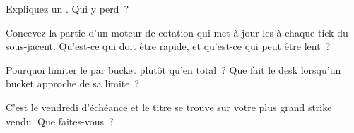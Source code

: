 \begin{interviewq}\label{iq:dv:options-market-making-in-practice:3}
Expliquez un . Qui y perd~?
\end{interviewq}

\begin{interviewq}\label{iq:dv:options-market-making-in-practice:4}
Concevez la partie d'un moteur de cotation qui met à jour les  à chaque tick du sous-jacent. Qu'est-ce qui doit être rapide, et qu'est-ce qui peut être lent~?
\end{interviewq}

\begin{interviewq}\label{iq:dv:options-market-making-in-practice:5}
Pourquoi limiter le  par bucket plutôt qu'en total~? Que fait le desk lorsqu'un bucket approche de sa limite~?
\end{interviewq}

\begin{interviewq}\label{iq:dv:options-market-making-in-practice:6}
C'est le vendredi d'échéance et le titre se trouve sur votre plus grand strike vendu. Que faites-vous~?
\end{interviewq}

